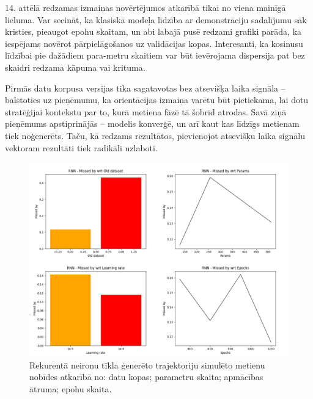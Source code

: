 \documentclass[12pt, a4paper]{article}
\numberwithin{equation}{section} %
\begin{document}
14. attēlā redzamas izmaiņas novērtējumos atkarībā tikai no viena mainīgā lieluma. Var secināt, ka klasiskā modeļa līdzība ar demonstrāciju sadalījumu sāk kristies, pieaugot epohu skaitam, un abi labajā pusē redzami grafiki parāda, ka iespējams novērot pārpielāgošanos uz validācijas kopas. Interesanti, ka kosinusu līdzībai pie dažādiem para-metru skaitiem var būt ievērojama dispersija pat bez skaidri redzama kāpuma vai krituma.

Pirmās datu korpusa versijas tika sagatavotas bez atsevišķa laika signāla -- balstoties uz pieņēmumu, ka orientācijas izmaiņa varētu būt pietiekama, lai dotu stratēģijai kontekstu par to, kurā metiena fāzē tā šobrīd atrodas. Savā ziņā pieņēmums apstiprinājās -- modelis konverģē, un arī kaut kas līdzīgs metienam tiek noģenerēts. Taču, kā redzams rezultātos, pievienojot atsevišķu laika signālu vektoram rezultāti tiek radikāli uzlaboti.

\begin{figure}[t!]
    \centering
    \includegraphics[width=16cm,page=1]{../img/rnn_missed.png}
    \caption{Rekurentā neironu tīkla ģenerēto trajektoriju simulēto metienu nobīdes atkarībā no: datu kopas; parametru skaita; apmācības ātruma; epohu skaita.}
\end{figure}
\end{document}
